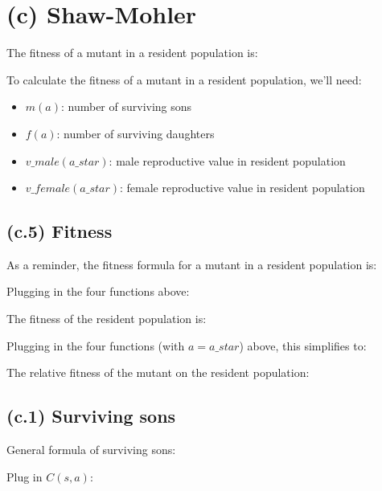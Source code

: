 \documentclass[11]{article}
\begin{document}
\section{(c) Shaw-Mohler}

The fitness of a mutant in a resident population is:



To calculate the fitness of a mutant in a resident population, we'll need:

\begin{itemize}
  \item $m(a)$: number of surviving sons
  \item $f(a)$: number of surviving daughters
  \item $v\_male(a\_star)$: male reproductive value in resident population
  \item $v\_female(a\_star)$: female reproductive value in resident population
\end{itemize}

\subsection{(c.5) Fitness}

As a reminder, the fitness formula for a mutant in a resident population is:



Plugging in the four functions above:



The fitness of the resident population is: 



Plugging in the four functions (with $a=a\_star$) above, this simplifies to:



The relative fitness of the mutant on the resident population:




\subsection{(c.1) Surviving sons}

General formula of surviving sons:



Plug in $C(s,a)$:


\end{document}
